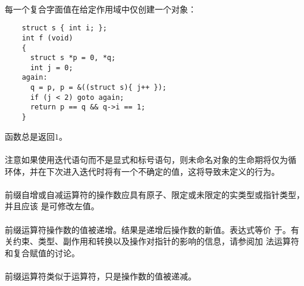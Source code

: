 {\paragraph{}
\ex 每一个复合字面值在给定作用域中仅创建一个对象：
\begin{lstlisting}
    struct s { int i; };
    int f (void)
    {
      struct s *p = 0, *q;
      int j = 0;
    again:
      q = p, p = &((struct s){ j++ });
      if (j < 2) goto again;
      return p == q && q->i == 1;
    }
\end{lstlisting}
函数总是返回$1$。

\paragraph{}
注意如果使用迭代语句而不是显式和标号语句，则未命名对象的生命期将仅为循
环体，并在下次进入迭代时将有一个不确定的值，这将导致未定义的行为。


\syntax
\paragraph{}
  \synprd[]{\tm{\&\ \ *\ \ +\ \ -\ \ \~\ \ !}}

\constraint
\paragraph{}
前缀自增或自减运算符的操作数应具有原子、限定或未限定的实类型或指针类型，并且应该
是可修改左值。

\semantic
\paragraph{}
前缀\tm{++}运算符操作数的值被递增。结果是递增后操作数的新值。表达式等价
于。有关约束、类型、副作用和转换以及操作对指针的影响的信息，请参阅加
法运算符和复合赋值的讨论。

\paragraph{}
前缀\tm{-\dsh}运算符类似于\tm{++}运算符，只是操作数的值被递减。

}
